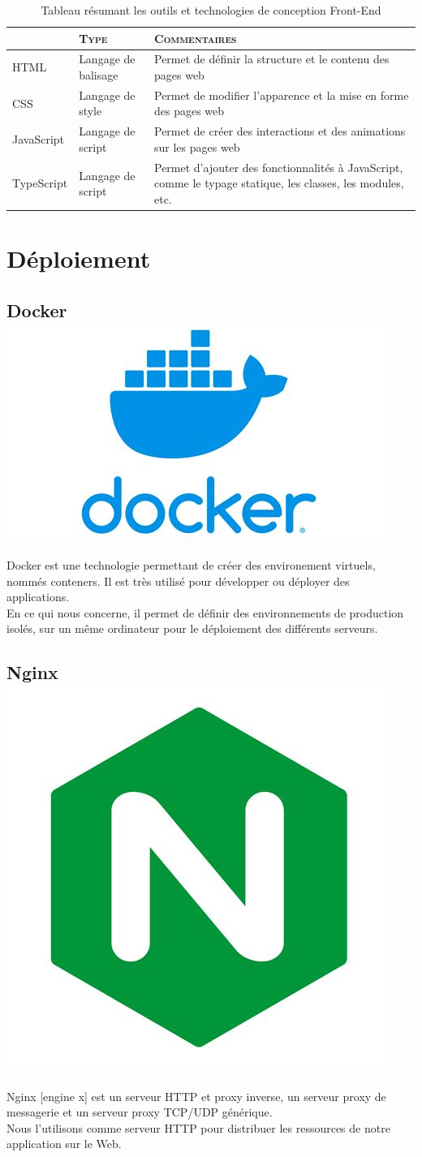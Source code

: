 			
			
			\begin{table}[t]
				\centering
				\begin{tabular}[pos]{ | b | m{} | m{} |}
					\rowcolor{lightgray}
					
					& \textbf{\textsc{\large{Type}}} & \textbf{\textsc{\large{Commentaires}}}\\
					\hline
					HTML & Langage de balisage & Permet de d\'efinir la structure et le contenu des pages web\\
					\hline
					CSS & Langage de style & Permet de modifier l'apparence et la mise en forme des pages web\\
					\hline
					JavaScript & Langage de script & Permet de cr\'eer des interactions et des animations sur les pages web\\
					\hline
					TypeScript & Langage de script & Permet d'ajouter des fonctionnalit\'es \`a JavaScript, comme le typage statique, les classes, les modules, etc.\\
					\hline
				\end{tabular}
				\caption{Tableau r\'esumant les outils et technologies de conception Front-End}
				\label{TabTechFront}
			\end{table}

	\section{D\'eploiement }
		\subsection{Docker  \includegraphics[height=2ex]{Pictures/dockerLogo.jpeg}}
			Docker est une technologie permettant de cr\'eer des environement virtuels, nomm\'es conteners. Il est tr\`es utilis\'e pour d\'evelopper ou d\'eployer des applications.\\
			En ce qui nous concerne, il permet de d\'efinir des environnements de production isol\'es, sur un m\^eme ordinateur pour le d\'eploiement des diff\'erents serveurs.
		
		\subsection{Nginx \includegraphics[height=2ex]{Pictures/nginxLogo.jpeg}}
			Nginx [engine x] est un serveur HTTP et proxy inverse, un serveur proxy de messagerie et un serveur proxy TCP/UDP g\'en\'erique\cite{nginx}.\\
			Nous l'utilisons comme serveur HTTP pour distribuer les ressources de notre application sur le Web.	
			
